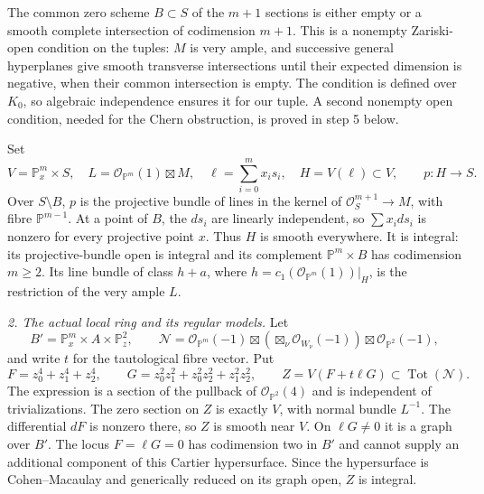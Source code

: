 The common zero scheme $B\subset S$ of the $m+1$ sections is
either empty or a smooth complete intersection of codimension
$m+1$. This is a nonempty Zariski-open condition on the tuples:
$M$ is very ample, and successive general hyperplanes give smooth
transverse intersections until their expected dimension is negative,
when their common intersection is empty. The condition is defined
over $K_0$, so algebraic independence ensures it for our tuple.
A second nonempty open condition, needed for the Chern obstruction,
is proved in step 5 below.

Set
\[
 V=\mathbb P^m_x\times S,\quad
 L=\mathcal O_{\mathbb P^m}(1)\boxtimes M,\quad
 \ell=\sum_{i=0}^m x_i s_i,\quad
 H=V(\ell)\subset V,
 \qquad p:H\longrightarrow S.
\]
Over $S\setminus B$, $p$ is the projective bundle of lines in
the kernel of $\mathcal O_S^{m+1}\to M$, with fibre
$\mathbb P^{m-1}$. At a point of $B$, the $ds_i$ are linearly
independent, so $\sum x_i ds_i$ is nonzero for every projective
point $x$. Thus $H$ is smooth everywhere. It is integral: its
projective-bundle open is integral and its complement
$\mathbb P^m\times B$ has codimension $m\ge2$. Its line bundle
of class $h+a$, where $h=c_1(\mathcal O_{\mathbb P^m}(1))|_H$,
is the restriction of the very ample $L$.

\emph{2. The actual local ring and its regular models.}
Let
\[
 B'=\mathbb P^m_x\times A\times\mathbb P^2_z,
 \qquad
 \mathcal N=\mathcal O_{\mathbb P^m}(-1)
       \boxtimes\left(\boxtimes_\nu\mathcal O_{W_\nu}(-1)\right)
       \boxtimes\mathcal O_{\mathbb P^2}(-1),
\]
and write $t$ for the tautological fibre vector. Put
\[
 F=z_0^4+z_1^4+z_2^4,\qquad
 G=z_0^2z_1^2+z_0^2z_2^2+z_1^2z_2^2,
 \qquad Z=V(F+t\ell G)\subset\operatorname{Tot}(\mathcal N).
\]
The expression is a section of the pullback of
$\mathcal O_{\mathbb P^2}(4)$ and is independent of
trivializations. The zero section on $Z$ is exactly $V$, with
normal bundle $L^{-1}$. The differential $dF$ is nonzero there,
so $Z$ is smooth near $V$. On $\ell G\ne0$ it is a graph over
$B'$. The locus $F=\ell G=0$ has codimension two in $B'$
and cannot supply an additional component of this Cartier
hypersurface. Since the hypersurface is Cohen--Macaulay and
generically reduced on its graph open, $Z$ is integral.

